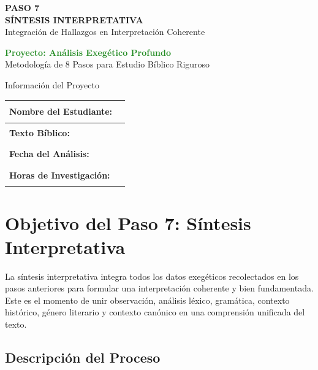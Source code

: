\documentclass[11pt,a4paper]{article}
\begin{document}
\begin{center}
    {\Huge\color{forestgreen}\textbf{PASO 7}}\\[0.5cm]
    {\Large\color{sagegreen}\textbf{SÍNTESIS INTERPRETATIVA}}\\[0.3cm]
    {\large\color{papergray}Integración de Hallazgos en Interpretación Coherente}\\[1cm]
    
    \begin{tcolorbox}[colback=olivegreen!10, colframe=olivegreen, width=0.8\textwidth]
        \centering
        \textcolor{forestgreen}{\textbf{Proyecto: Análisis Exegético Profundo}}\\
        \textcolor{papergray}{Metodología de 8 Pasos para Estudio Bíblico Riguroso}
    \end{tcolorbox}
\end{center}

\vspace{1cm}

\begin{infobox}{Información del Proyecto}
\begin{tabularx}{\textwidth}{|X|X|}
\hline
\textbf{Nombre del Estudiante:} & \rule{6cm}{0.4pt} \\[0.8cm]
\hline
\textbf{Texto Bíblico:} & \rule{6cm}{0.4pt} \\[0.8cm]
\hline
\textbf{Fecha del Análisis:} & \rule{6cm}{0.4pt} \\[0.8cm]
\hline
\textbf{Horas de Investigación:} & \rule{6cm}{0.4pt} \\[0.8cm]
\hline
\end{tabularx}
\end{infobox}

\section{Objetivo del Paso 7: Síntesis Interpretativa}

La síntesis interpretativa integra todos los datos exegéticos recolectados en los pasos anteriores para formular una interpretación coherente y bien fundamentada. Este es el momento de unir observación, análisis léxico, gramática, contexto histórico, género literario y contexto canónico en una comprensión unificada del texto.

\subsection{Descripción del Proceso}
\end{document}
